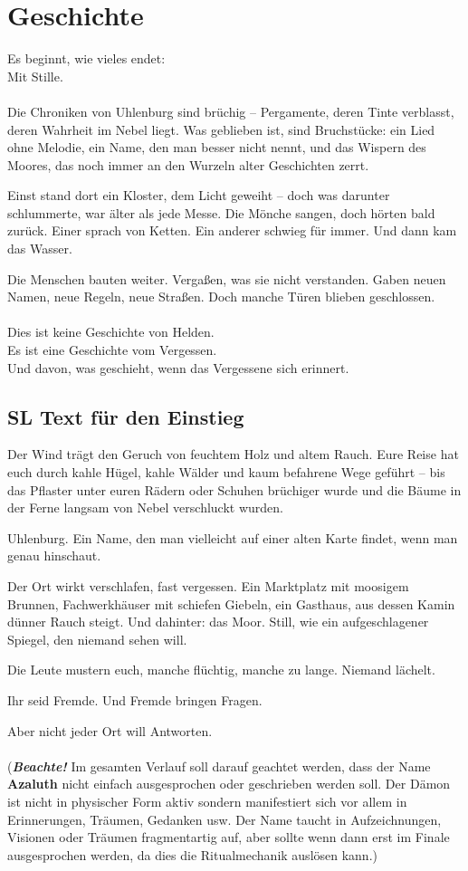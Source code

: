 \chapter{Geschichte}
Es beginnt, wie vieles endet:\\
Mit Stille.
\\\\
Die Chroniken von Uhlenburg sind brüchig – Pergamente, deren Tinte verblasst, deren Wahrheit im Nebel liegt. Was geblieben ist, sind Bruchstücke: ein Lied ohne Melodie, ein Name, den man besser nicht nennt, und das Wispern des Moores, das noch immer an den Wurzeln alter Geschichten zerrt.

Einst stand dort ein Kloster, dem Licht geweiht – doch was darunter schlummerte, war älter als jede Messe. Die Mönche sangen, doch hörten bald zurück. Einer sprach von Ketten. Ein anderer schwieg für immer. Und dann kam das Wasser.

Die Menschen bauten weiter. Vergaßen, was sie nicht verstanden. Gaben neuen Namen, neue Regeln, neue Straßen. Doch manche Türen blieben geschlossen.
\\\\
Dies ist keine Geschichte von Helden.\\
Es ist eine Geschichte vom Vergessen.\\
Und davon, was geschieht, wenn das Vergessene sich erinnert.\\

\section*{SL Text für den Einstieg}
Der Wind trägt den Geruch von feuchtem Holz und altem Rauch.
Eure Reise hat euch durch kahle Hügel, kahle Wälder und kaum befahrene Wege geführt – bis das Pflaster unter euren Rädern oder Schuhen brüchiger wurde und die Bäume in der Ferne langsam von Nebel verschluckt wurden.

Uhlenburg. Ein Name, den man vielleicht auf einer alten Karte findet, wenn man genau hinschaut.

Der Ort wirkt verschlafen, fast vergessen.
Ein Marktplatz mit moosigem Brunnen, Fachwerkhäuser mit schiefen Giebeln, ein Gasthaus, aus dessen Kamin dünner Rauch steigt. Und dahinter: das Moor. Still, wie ein aufgeschlagener Spiegel, den niemand sehen will.

Die Leute mustern euch, manche flüchtig, manche zu lange. Niemand lächelt.

Ihr seid Fremde. Und Fremde bringen Fragen.

Aber nicht jeder Ort will Antworten.
\\\\
(\textbf{\textit{Beachte!}} Im gesamten Verlauf soll darauf geachtet werden, dass der Name \textbf{Azaluth} nicht einfach ausgesprochen oder geschrieben werden soll. Der Dämon ist nicht in physischer Form aktiv sondern manifestiert sich vor allem in Erinnerungen, Träumen, Gedanken usw. Der Name taucht in Aufzeichnungen, Visionen oder Träumen fragmentartig auf, aber sollte wenn dann erst im Finale ausgesprochen werden, da dies die Ritualmechanik auslösen kann.)